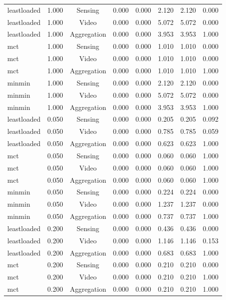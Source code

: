 \begin{table}
\begin{tabular}{lccccccc}
leastloaded & 1.000 & Sensing & 0.000 & 0.000 & 2.120 & 2.120 & 0.000 \\
leastloaded & 1.000 & Video & 0.000 & 0.000 & 5.072 & 5.072 & 0.000 \\
leastloaded & 1.000 & Aggregation & 0.000 & 0.000 & 3.953 & 3.953 & 1.000 \\
mct & 1.000 & Sensing & 0.000 & 0.000 & 1.010 & 1.010 & 0.000 \\
mct & 1.000 & Video & 0.000 & 0.000 & 1.010 & 1.010 & 0.000 \\
mct & 1.000 & Aggregation & 0.000 & 0.000 & 1.010 & 1.010 & 1.000 \\
minmin & 1.000 & Sensing & 0.000 & 0.000 & 2.120 & 2.120 & 0.000 \\
minmin & 1.000 & Video & 0.000 & 0.000 & 5.072 & 5.072 & 0.000 \\
minmin & 1.000 & Aggregation & 0.000 & 0.000 & 3.953 & 3.953 & 1.000 \\
leastloaded & 0.050 & Sensing & 0.000 & 0.000 & 0.205 & 0.205 & 0.092 \\
leastloaded & 0.050 & Video & 0.000 & 0.000 & 0.785 & 0.785 & 0.059 \\
leastloaded & 0.050 & Aggregation & 0.000 & 0.000 & 0.623 & 0.623 & 1.000 \\
mct & 0.050 & Sensing & 0.000 & 0.000 & 0.060 & 0.060 & 1.000 \\
mct & 0.050 & Video & 0.000 & 0.000 & 0.060 & 0.060 & 1.000 \\
mct & 0.050 & Aggregation & 0.000 & 0.000 & 0.060 & 0.060 & 1.000 \\
minmin & 0.050 & Sensing & 0.000 & 0.000 & 0.224 & 0.224 & 0.000 \\
minmin & 0.050 & Video & 0.000 & 0.000 & 1.237 & 1.237 & 0.000 \\
minmin & 0.050 & Aggregation & 0.000 & 0.000 & 0.737 & 0.737 & 1.000 \\
leastloaded & 0.200 & Sensing & 0.000 & 0.000 & 0.436 & 0.436 & 0.000 \\
leastloaded & 0.200 & Video & 0.000 & 0.000 & 1.146 & 1.146 & 0.153 \\
leastloaded & 0.200 & Aggregation & 0.000 & 0.000 & 0.683 & 0.683 & 1.000 \\
mct & 0.200 & Sensing & 0.000 & 0.000 & 0.210 & 0.210 & 0.000 \\
mct & 0.200 & Video & 0.000 & 0.000 & 0.210 & 0.210 & 1.000 \\
mct & 0.200 & Aggregation & 0.000 & 0.000 & 0.210 & 0.210 & 1.000 \\

\end{tabular}
\end{table}
